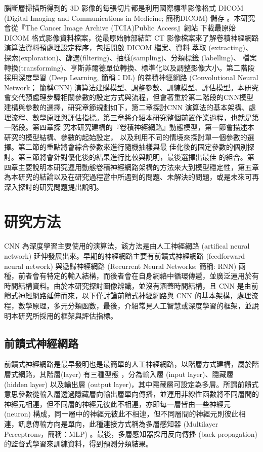 \documentclass[12pt, a4paper]{article} 				%
\begin{document}
腦斷層掃描所得到的 3D 影像的每張切片都是利用國際標準影像格式 DICOM (Digital Imaging and Communications in Medicine; 簡稱DICOM) 儲存 。本研究會從『The Cancer Image Archive (TCIA)Public Access』網站\cite{Clark2013} 下載最原始 DICOM 格式影像資料檔案，從最原始肺部結節 CT 影像檔案來了解卷積神經網路演算法資料預處理設定程序，包括開啟 DICOM 檔案、資料
萃取 (extracting)、探索(exploration)、篩選(filtering)、抽樣(sampling)、分類標籤 (labelling)、
檔案轉換(transforming)、亨斯菲爾德單位轉換、標準化以及調整影像大小。第二階段
採用深度學習 (Deep Learning, 簡稱：DL) 的卷積神經網路 (Convolutional Neural Network；
簡稱CNN) 演算法建購模型、調整參數、訓練模型、評估模型。本研究會交代預處理步驟相關參數的設定方式與流程，但會著重於第二階段的CNN模型建構與參數的選擇，研究章節規劃如下，第二章探討CNN 演算法的基本架構、處理流程、數學原理與評估指標。第三章將介紹本研究整個前置作業過程，也就是第一階段。第四章探
究本研究建構的『卷積神經網路』動態模型，第一節會描述本研究的模型結構、參數的起始設定，
以及利用不同的情境來探討單一個參數的選擇。第二節的重點將會綜合參數來進行隨機抽樣與最
佳化後的固定參數的個別探討。第三節將會針對優化後的結果進行比較與說明，最後選擇出最佳
的組合。第四章主要說明本研究運用動態卷積神經網路架構的方法來大到模型穩定性，第五章為本研究的結論以及在研究過程當中所遇到的問題、未解決的問題，或是未來可再深入探討的研究問題提出說明。

\section{研究方法}
CNN 為深度學習主要使用的演算法，該方法是由人工神經網路 (artifical neural network) 延伸發展出來。早期的神經網路主要有前饋式神經網路 (feedforward neural network) 與遞歸神經網路 (Recurrent Neural Networks; 簡稱: RNN) 兩種，前者會有特定的輸入結構，而後者會在自身網絡中循環傳遞，並廣泛運用於有時間結構資料。由於本研究探討圖像辨識，並沒有涵蓋時間結構，且 CNN 是由前饋式神經網路延伸而來，以下僅討論前饋式神經網路與 CNN 的基本架構，處理流程，數學原理，多元分類函數，最後，介紹常見人工智慧或深度學習的框架，並說明本研究所採用的框架與評估指標。

\subsection{前饋式神經網路}
前饋式神經網路是最早發明也是最簡單的人工神經網路，以階層方式建構，屬於階層式網路，其階層(layer) 有三種型態 ，分為輸入層 (input layer)、隱藏層 (hidden layer) 以及輸出層 (output layer)，其中隱藏層可設定為多層。所謂前饋式意思參數從輸入層透過隱藏層向輸出層單向傳播，並運用非線性函數將不同層間的神經元相連，但不同層的神經元彼此不相連，亦即每一層皆由一些神經元 (neuron) 構成，同一層中的神經元彼此不相連，但不同層間的神經元則彼此相連，訊息傳輸方向是單向，此種連接方式稱為多層感知器 (Multilayer Perceptrons，簡稱：MLP) 。最後，多層感知器採用反向傳播 (back-propagation) 的監督式學習來訓練資料，得到預測分類結果。
\end{document}
